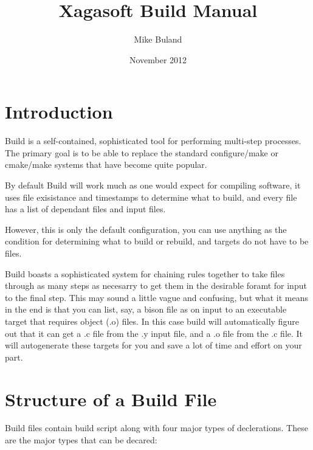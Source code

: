 \documentclass[letterpaper]{book}
\begin{document}
\title{Xagasoft Build Manual}
\author{Mike Buland}
\date{November 2012}
\maketitle

\tableofcontents

\chapter{Introduction}
Build is a self-contained, sophisticated tool for performing multi-step
processes. The primary goal is to be able to replace the standard
configure/make or cmake/make systems that have become quite popular.

By default Build will work much as one would expect for compiling software, it
uses file exisistance and timestamps to determine what to build, and every file
has a list of dependant files and input files.

However, this is only the default configuration, you can use anything as the
condition for determining what to build or rebuild, and targets do not have to
be files.

Build boasts a sophisticated system for chaining rules together to take files
through as many steps as necesarry to get them in the desirable foramt for input
to the final step.  This may sound a little vague and confusing, but what it
means in the end is that you can list, say, a bison file as on input to an
executable target that requires object (.o) files.  In this case build will
automatically figure out that it can get a .c file from the .y input file, and
a .o file from the .c file.  It will autogenerate these targets for you and
save a lot of time and effort on your part.

\chapter{Structure of a Build File}
Build files contain build script along with four major types of declerations.
These are the major types that can be decared:
\end{document}
